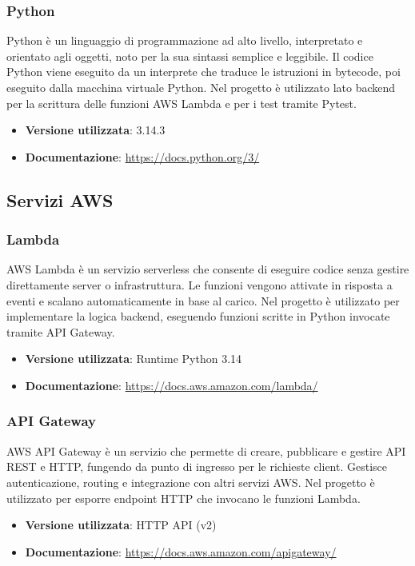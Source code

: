 \documentclass[a4paper,12pt]{article}
\begin{document}
\subsubsection{Python}
Python è un linguaggio di programmazione ad alto livello, interpretato e orientato agli oggetti, noto per la sua sintassi semplice e leggibile. Il codice Python viene eseguito da un interprete che traduce le istruzioni in bytecode, poi eseguito dalla macchina virtuale Python. Nel progetto è utilizzato lato backend per la scrittura delle funzioni AWS Lambda e per i test tramite Pytest.
\begin{itemize}
    \item \textbf{Versione utilizzata}: 3.14.3
    \item \textbf{Documentazione}: \url{https://docs.python.org/3/}
\end{itemize}

\subsection{Servizi AWS} \label{subsec:aws}

\subsubsection{Lambda}
AWS Lambda è un servizio serverless che consente di eseguire codice senza gestire direttamente server o infrastruttura. Le funzioni vengono attivate in risposta a eventi e scalano automaticamente in base al carico. Nel progetto è utilizzato per implementare la logica backend, eseguendo funzioni scritte in Python invocate tramite API Gateway.
\begin{itemize}
    \item \textbf{Versione utilizzata}: Runtime Python 3.14
    \item \textbf{Documentazione}: \url{https://docs.aws.amazon.com/lambda/}
\end{itemize}

\subsubsection{API Gateway}
AWS API Gateway è un servizio che permette di creare, pubblicare e gestire API REST e HTTP, fungendo da punto di ingresso per le richieste client. Gestisce autenticazione, routing e integrazione con altri servizi AWS. Nel progetto è utilizzato per esporre endpoint HTTP che invocano le funzioni Lambda.
\begin{itemize}
    \item \textbf{Versione utilizzata}: HTTP API (v2)
    \item \textbf{Documentazione}: \url{https://docs.aws.amazon.com/apigateway/}
\end{itemize}
\end{document}
